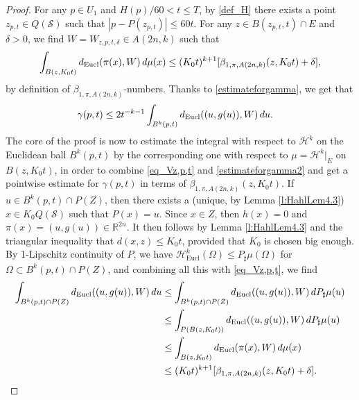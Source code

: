 \documentclass[12pt]{amsart}
\newcommand{\R}{\mathbb R}
\numberwithin{equation}{section}
\theoremstyle{plain}
\theoremstyle{definition}
\theoremstyle{remark}
\begin{document}
\begin{proof}
For any $p\in U_1$ and $H(p)/60<t\leq T$, by \eqref{def_H} there exists a point $z_{p,t}\in Q(\mathcal S)$ such that $|p-P(z_{p,t})|\leq 60 t$. For any $z\in B(z_{p,t},t)\cap E$ and $\delta>0$, we find $W=W_{z,p,t,\delta}\in A(2n,k)$ such that
\begin{equation}\label{eq_Vz,p,t}
\int_{B(z,K_0t)} d_{\rm Eucl}(\pi(x), W)\, d\mu(x)\leq (K_0 t)^{k+1}[\beta_{1,\pi,A(2n,k)}(z, K_0t)+\delta],
\end{equation}
by definition of $\beta_{1,\pi,A(2n,k)}$-numbers. Thanks to \eqref{estimateforgamma}, we get that
\begin{align}\label{estimateforgamma2}\gamma(p,t)&\leq 2t^{-k-1}\int_{B^k(p,t)}d_{\rm Eucl}((u,g(u)),W)\,du%
.\end{align}
The core of the proof is now to estimate the integral 
with respect to $\mathcal{H}^k$
on the Euclidean ball $B^k(p,t)$ by the corresponding one with respect to $\mu=\mathcal{H}^k|_E$ on  $B(z, K_0t)$, in order to combine \eqref{eq_Vz,p,t} and \eqref{estimateforgamma2} and get a pointwise estimate for $\gamma(p,t)$ in terms of $\beta_{1,\pi, A(2n,k)}(z, K_0t)$. If $u\in B^k(p,t)\cap P(Z)$, then there exists a (unique, by Lemma \ref{l:HahlLem4.3}) $x\in K_0Q(\mathcal S)$ such that $P(x)=u$. Since $x\in Z$, then $h(x)=0$ and $\pi(x)=(u,g(u))\in\R^{2n}$.
It then follows by Lemma \ref{l:HahlLem4.3} and the triangular inequality that $d(x,z)\leq K_0t$, provided that $K_0$ is chosen big enough. By 1-Lipschitz continuity of $P$, we have $\mathcal{H}_{\mathrm{Eucl}}^k(\Omega)\leq  
P_{\sharp} \mu(\Omega) $ for $\Omega\subset B^k(p,t)\cap P(Z)$, and combining all this with \eqref{eq_Vz,p,t}, we find 
\begin{equation}\label{estimateinP(Z)}\begin{aligned}\int_{B^k(p,t)\cap P(Z)}d_{\rm Eucl}((u,g(u)),W)\,du&\leq\int_{B^k(p,t)\cap P(Z)}d_{\rm Eucl}((u,g(u)),W)\,dP_{\sharp} \mu(u) \\&\leq \int_{P(B(z,K_0t))}d_{\rm Eucl}((u,g(u)),W)\,dP_{\sharp} \mu(u)\\ &\leq \int_{B(z,K_0t)}d_{\rm Eucl}(\pi(x),W)\,d\mu(x)\\ &\leq (K_0t)^{k+1}[\beta_{1,\pi,A(2n,k)}(z,K_0t)+\delta].\end{aligned}\end{equation}

\end{proof}
\end{document}
